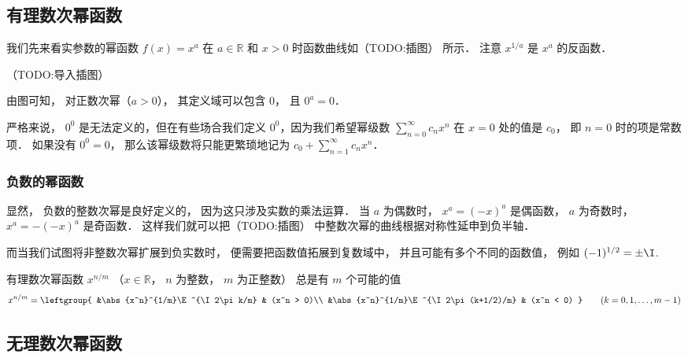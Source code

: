 
\subsection{有理数次幂函数}
我们先来看实参数的幂函数 $f(x) = x^a$ 在 $a\in\mathbb R$ 和 $x > 0$ 时函数曲线如（TODO:插图） 所示． 注意 $x^{1/a}$ 是 $x^a$ 的反函数．

（TODO:导入插图）

由图可知， 对正数次幂（$a > 0$）， 其定义域可以包含 $0$， 且 $0^a = 0$．

严格来说， $0^0$ 是无法定义的，但在有些场合我们定义 $0^0$，因为我们希望幂级数 $\sum_{n=0}^\infty c_n x^n$ 在 $x = 0$ 处的值是 $c_0$， 即 $n=0$ 时的项是常数项． 如果没有 $0^0 = 0$， 那么该幂级数将只能更繁琐地记为 $c_0 + \sum_{n=1}^\infty c_n x^n$．

\subsubsection{负数的幂函数}
显然， 负数的整数次幂是良好定义的， 因为这只涉及实数的乘法运算． 当 $a$ 为偶数时， $x^a = (-x)^a$ 是偶函数， $a$ 为奇数时， $x^a = -(-x)^a$ 是奇函数． 这样我们就可以把（TODO:插图） 中整数次幂的曲线根据对称性延申到负半轴．

而当我们试图将非整数次幂扩展到负实数时， 便需要把函数值拓展到复数域中， 并且可能有多个不同的函数值， 例如 $(-1)^{1/2} = \pm\I$. 

有理数次幂函数 $x^{n/m}$ （$x\in \mathbb R$， $n$ 为整数， $m$ 为正整数） 总是有 $m$ 个可能的值
\begin{equation}
x^{n/m} = \leftgroup{
&\abs{x^n}^{1/m}\E^{\I 2\pi k/m} & (x^n > 0)\\
&\abs{x^n}^{1/m}\E^{\I 2\pi (k+1/2)/m} & (x^n < 0)
}\qquad (k = 0,1,\dots, m-1)
\end{equation}

\subsection{无理数次幂函数}
